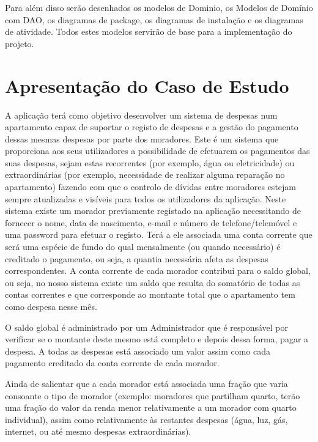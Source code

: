 Para além disso serão desenhados os modelos de Dominio, os Modelos de Domínio com DAO, os diagramas de package, os diagramas de instalação e os diagramas de atividade. Todos estes modelos servirão de base para a implementação do projeto. 








\section{Apresentação do Caso de Estudo}

A aplicação terá como objetivo desenvolver um sistema de despesas num apartamento  capaz de suportar o registo de despesas e a gestão do pagamento dessas mesmas despesas por parte dos moradores. Este é um sistema que proporciona aos seus utilizadores a possibilidade de efetuarem os pagamentos das suas despesas, sejam estas recorrentes (por exemplo, água ou eletricidade) ou extraordinárias (por exemplo, necessidade de realizar alguma reparação no apartamento) fazendo com que o controlo de dívidas entre moradores estejam sempre atualizadas e visíveis para todos os utilizadores da aplicação. 	
Neste sistema existe um morador previamente registado na aplicação necessitando de fornecer o nome, data de nascimento, e-mail e número de telefone/telemóvel e uma password para efetuar o registo. Terá a ele associada uma conta corrente que será uma espécie de fundo do qual mensalmente (ou quando necessário) é creditado o pagamento, ou seja, a quantia necessária afeta as despesas correspondentes. A conta corrente de cada morador contribui para o saldo global, ou seja, no nosso sistema existe um saldo que resulta do somatório de todas as contas correntes e que corresponde ao montante total que o apartamento tem como despesa nesse mês. 

O saldo global é administrado por um Administrador que é responsável por verificar se o montante deste mesmo está completo e depois dessa forma, pagar a despesa. A todas as despesas está associado um valor assim como cada pagamento creditado da conta corrente de cada morador. 

Ainda de salientar que a cada morador está associada uma fração que varia consoante o tipo de morador (exemplo: moradores que partilham quarto, terão uma fração do valor da renda menor relativamente a um morador com quarto individual), assim como relativamente às restantes despesas (água, luz, gás, internet, ou até mesmo despesas extraordinárias). 


 	